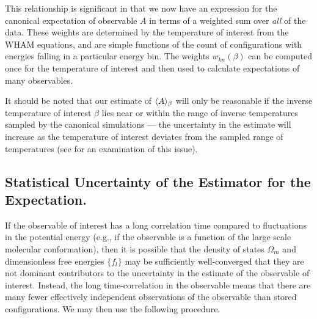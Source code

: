 This relationship is significant in that we now have an expression for the canonical expectation of observable $A$ in terms of a weighted sum over \emph{all} of the data.  These weights are determined by the temperature of interest from the WHAM equations, and are simple functions of the count of configurations with energies falling in a particular energy bin.  The weights $w_{kn}(\beta)$ can be computed once for the temperature of interest and then used to calculate expectations of many observables.

It should be noted that our estimate of $\langle A \rangle_\beta$ will only be reasonable if the inverse temperature of interest $\beta$ lies near or within the range of inverse temperatures sampled by the canonical simulations --- the uncertainty in the estimate will increase as the temperature of interest deviates from the sampled range of temperatures (see \cite{ferrenberg:1995a,newman:1999a} for an examination of this issue).

\subsection{Statistical Uncertainty of the Estimator for the Expectation.}
\label{wham:section:canonical-uncertainty-in-expectation}

If the observable of interest has a long correlation time compared to fluctuations in the potential energy (e.g., if the observable is a function of the large scale molecular conformation), then it is possible that the density of states $\Omega_m$ and dimensionless free energies $\{f_l\}$ may be sufficiently well-converged that they are not dominant contributors to the uncertainty in the estimate of the observable of interest.
Instead, the long time-correlation in the observable means that there are many fewer effectively independent observations of the observable than stored configurations.
We may then use the following procedure.

